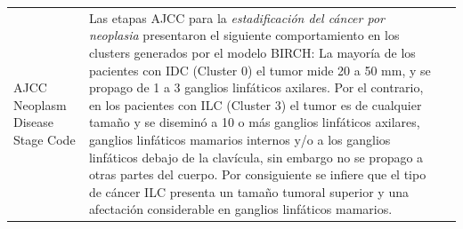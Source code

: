 \begin{table}[htb!]
\begin{threeparttable}
\begin{tabular}{p{2.5cm} p{7cm} p{6.5cm}}
			\\ \hline
			AJCC Neoplasm Disease Stage Code
			& Las etapas AJCC para la \textit{estadificación del cáncer por neoplasia} presentaron el siguiente comportamiento en los clusters generados por el modelo BIRCH: La mayoría de los pacientes con IDC (Cluster 0) el tumor mide 20 a 50 mm, y se  propago de 1 a 3 ganglios linfáticos axilares. Por el contrario, en los pacientes con ILC (Cluster 3) el  tumor es de cualquier tamaño y se diseminó a 10 o más ganglios linfáticos axilares, ganglios linfáticos mamarios internos y/o a los ganglios linfáticos debajo de la clavícula, sin embargo no se propago a otras partes del cuerpo. Por consiguiente se infiere que el tipo de cáncer ILC presenta un tamaño tumoral superior y una afectación considerable en ganglios linfáticos mamarios.   
			

\end{tabular}
\end{threeparttable}
\end{table}
